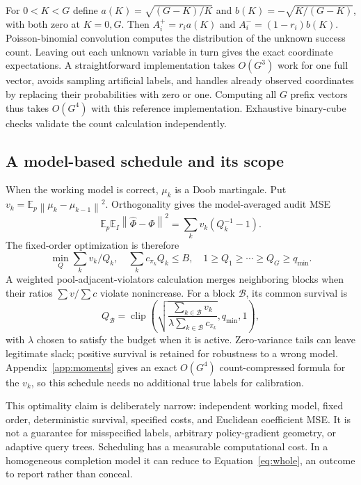 \documentclass[11pt]{article}
\newcommand{\E}{\mathbb E}
\newcommand{\clip}{\operatorname{clip}}
\newcommand{\norm}[1]{\left\lVert#1\right\rVert}
\begin{document}
For $0<K<G$ define $a(K)=\sqrt{(G-K)/K}$ and $b(K)=-\sqrt{K/(G-K)}$, with both zero at $K=0,G$. Then $A_i^+=r_i a(K)$ and $A_i^-=(1-r_i)b(K)$. Poisson-binomial convolution computes the distribution of the unknown success count. Leaving out each unknown variable in turn gives the exact coordinate expectations. A straightforward implementation takes $O(G^3)$ work for one full vector, avoids sampling artificial labels, and handles already observed coordinates by replacing their probabilities with zero or one. Computing all $G$ prefix vectors thus takes $O(G^4)$ with this reference implementation. Exhaustive binary-cube checks validate the count calculation independently.

\subsection{A model-based schedule and its scope}\label{sec:schedule}
When the working model is correct, $\mu_k$ is a Doob martingale. Put $v_k=\E_p\norm{\mu_k-\mu_{k-1}}^2$. Orthogonality gives the model-averaged audit MSE
\begin{equation}\label{eq:modelrisk}
 \E_p\E_I\norm{\widehat\Phi-\Phi}^2=\sum_k v_k(Q_k^{-1}-1).
\end{equation}
The fixed-order optimization is therefore
\begin{equation}\label{eq:opt}
 \min_Q\sum_k v_k/Q_k,\quad
 \sum_k c_{\pi_k}Q_k\le B,\quad
 1\ge Q_1\ge\cdots\ge Q_G\ge q_{\min}.
\end{equation}
A weighted pool-adjacent-violators calculation merges neighboring blocks when their ratios $\sum v/\sum c$ violate nonincrease. For a block $\mathcal B$, its common survival is
\begin{equation}\label{eq:pava}
 Q_{\mathcal B}=\clip\left(
 \sqrt{\frac{\sum_{k\in\mathcal B}v_k}{\lambda\sum_{k\in\mathcal B}c_{\pi_k}}},q_{\min},1\right),
\end{equation}
with $\lambda$ chosen to satisfy the budget when it is active. Zero-variance tails can leave legitimate slack; positive survival is retained for robustness to a wrong model. Appendix~\ref{app:moments} gives an exact $O(G^4)$ count-compressed formula for the $v_k$, so this schedule needs no additional true labels for calibration.

This optimality claim is deliberately narrow: independent working model, fixed order, deterministic survival, specified costs, and Euclidean coefficient MSE. It is not a guarantee for misspecified labels, arbitrary policy-gradient geometry, or adaptive query trees. Scheduling has a measurable computational cost. In a homogeneous completion model it can reduce to Equation~\eqref{eq:whole}, an outcome to report rather than conceal.
\end{document}
